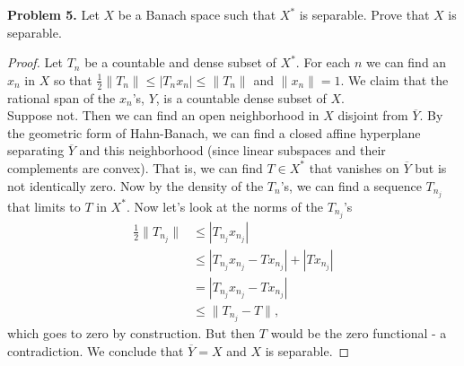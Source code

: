\documentclass[11pt,letterpaper]{report}
\begin{document}
\noindent\textbf{Problem 5. }
Let $X$ be a Banach space such that $X^*$ is separable. Prove that $X$ is separable.
\begin{proof}
	Let $T_n$ be a countable and dense subset of $X^*$. For each $n$ we can find an $x_n$ in $X$ so that $\frac{1}{2}\|T_n\| \leq |T_n x_n| \leq \|T_n\|$ and $\|x_n\| = 1$. We claim that the rational span of the $x_n$'s, $Y$, is a countable dense subset of $X$.\\

	\noindent Suppose not. Then we can find an open neighborhood in $X$ disjoint from $\overline{Y}$. By the geometric form of Hahn-Banach, we can find a closed affine hyperplane separating $\overline{Y}$ and this neighborhood (since linear subspaces and their complements are convex). That is, we can find $T\in X^*$ that vanishes on $\overline{Y}$ but is not identically zero. Now by the density of the $T_n$'s, we can find a sequence $T_{n_j}$ that limits to $T$ in $X^*$. Now let's look at the norms of the $T_{n_j}$'s
	\begin{align*}
		\frac{1}{2}\|T_{n_j}\| &\leq |T_{n_j}x_{n_j}|\\
		&\leq |T_{n_j}x_{n_j} - Tx_{n_j}| + |Tx_{n_j}|\\
		&= |T_{n_j}x_{n_j}-Tx_{n_j}|\\
		&\leq \|T_{n_j}-T\|,
	\end{align*}
	which goes to zero by construction. But then $T$ would be the zero functional - a contradiction. We conclude that $\overline{Y} = X$ and $X$ is separable.
\end{proof}
\end{document}
